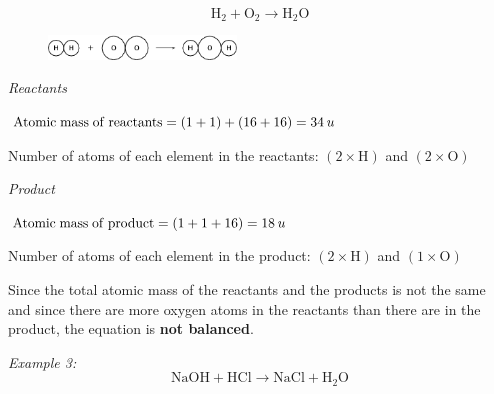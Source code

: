     \begin{equation}
    {\mathrm{H}}_{2}+{\mathrm{O}}_{2}\to \mathrm{H}{}_{2}\mathrm{O}\tag{13.2}
      \end{equation}
        \par 
        \label{m38726*id63399}
    \setcounter{subfigure}{0}
	\begin{figure}[H] %
    \begin{center}
    \label{m38726*id63402!!!underscore!!!media}\label{m38726*id63402!!!underscore!!!printimage}\includegraphics[width=5cm]{col11305.imgs/m38726_CG10C5_002.png} %
      \vspace{2pt}
    \vspace{.1in}
    \end{center}
 \end{figure}       
        \par 
        \label{m38726*id63409}
          \textsl{Reactants}
        \par 
        \label{m38726*id63415}$\mathrm{Atomic\; mass\; of\; reactants}=\left(1+1\right)+\left(16+16\right)=\mathrm{34}\phantom{\rule{2pt}{0ex}}u$\par 
        \label{m38726*id63419}Number of atoms of each element in the reactants: $\left(2\ensuremath{\times}\mathrm{H}\right)$ and $\left(2\ensuremath{\times}\mathrm{O}\right)$\par 
        \label{m38726*id63438}
          \textsl{Product}
        \par 
        \label{m38726*id63446}$\mathrm{Atomic\; mass\; of\; product}=\left(1+1+16\right)=\mathrm{18}\phantom{\rule{2pt}{0ex}}u$\par 
        \label{m38726*id63450}Number of atoms of each element in the product: $\left(2\ensuremath{\times}\mathrm{H}\right)$ and $\left(1\ensuremath{\times}\mathrm{O}\right)$\par 
        \label{m38726*id63470}Since the total atomic mass of the reactants and the products is not the same and since there are more oxygen atoms in the reactants than there are in the product, the equation is \textbf{not balanced}.\par 
        \label{m38726*id63480}
          \textsl{Example 3:}
        \label{m38726*id63488}\nopagebreak\noindent{}
    \begin{equation}
    \mathrm{NaOH}+\mathrm{HCl}\to \mathrm{NaCl}+\mathrm{H}{}_{2}\mathrm{O}\tag{13.3}
      \end{equation}
